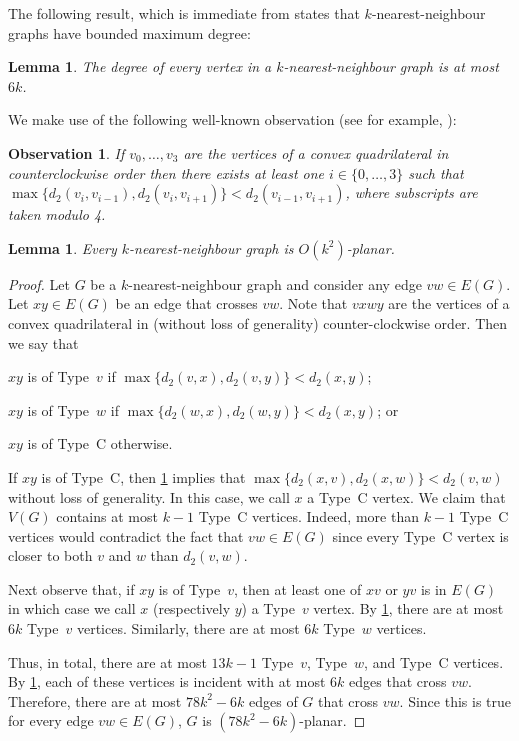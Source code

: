 \documentclass{patmorin}
\theoremstyle{plain}
\newtheorem{lem}[thm]{Lemma}
\newtheorem{obs}[thm]{Observation}
\theoremstyle{definition}
\begin{document}
The following result, which is immediate from \citet[Corollary~4.2.6]{abrego.munroy.ea:on} states that $k$-nearest-neighbour graphs have bounded maximum degree:
\begin{lem}
\label{k-nn-max-degree}
The degree of every vertex in a $k$-nearest-neighbour graph is at most $6k$.
\end{lem}

We make use of the following well-known observation (see for example, \citet[Lemma~2]{bose.morin.ea:routing}):
\begin{obs}
\label{convex}
If $v_0,\ldots,v_3$ are the vertices of a convex quadrilateral in counterclockwise order then there exists at least one $i\in\{0,\ldots,3\}$ such that $\max\{d_2(v_i,v_{i-1}), d_2(v_i,v_{i+1})\} < d_2(v_{i-1},v_{i+1})$, where subscripts are taken modulo 4.
\end{obs}

\begin{lem}
\label{nearest-neighbour}
  Every $k$-nearest-neighbour graph is $O(k^2)$-planar.
\end{lem}

\begin{proof}
  Let $G$ be a $k$-nearest-neighbour graph and consider any edge $vw\in E(G)$.
  Let $xy\in E(G)$ be an edge that crosses $vw$.  Note that $vxwy$ are the vertices of a convex quadrilateral in (without loss of generality) counter-clockwise order. Then we say that
  \begin{compactenum}
    \item $xy$ is of Type~$v$ if $\max\{d_2(v,x), d_2(v,y)\}< d_2(x,y)$;
    \item $xy$ is of Type~$w$ if $\max\{d_2(w,x), d_2(w,y)\}< d_2(x,y)$; or
    \item $xy$ is of Type~C otherwise.
  \end{compactenum}
  If $xy$ is of Type~C, then \cref{convex} implies that $\max\{d_2(x,v),d_2(x,w)\} < d_2(v,w)$ without loss of generality.
   In this case, we call $x$ a Type~C vertex.  We claim that $V(G)$ contains at most $k-1$ Type~C vertices.  Indeed, more than $k-1$ Type~C vertices would contradict the fact that $vw\in E(G)$ since every Type~C vertex is closer to both $v$ and $w$ than $d_2(v,w)$.

  Next observe that, if $xy$ is of Type~$v$, then at least one of $xv$ or $yv$ is in $E(G)$ in which case we call $x$ (respectively $y$) a Type~$v$ vertex.  By \cref{k-nn-max-degree}, there are at most $6k$ Type~$v$ vertices.  Similarly, there are at most $6k$ Type~$w$ vertices.

  Thus, in total, there are at most $13k-1$ Type~$v$, Type~$w$, and Type~C vertices. By \cref{k-nn-max-degree}, each of these vertices is incident with at most $6k$ edges that cross $vw$. Therefore, there are at most $78k^2-6k$ edges of $G$ that cross $vw$.  Since this is true for every edge $vw\in E(G)$, $G$ is $(78k^2-6k)$-planar.
\end{proof}
\end{document}
